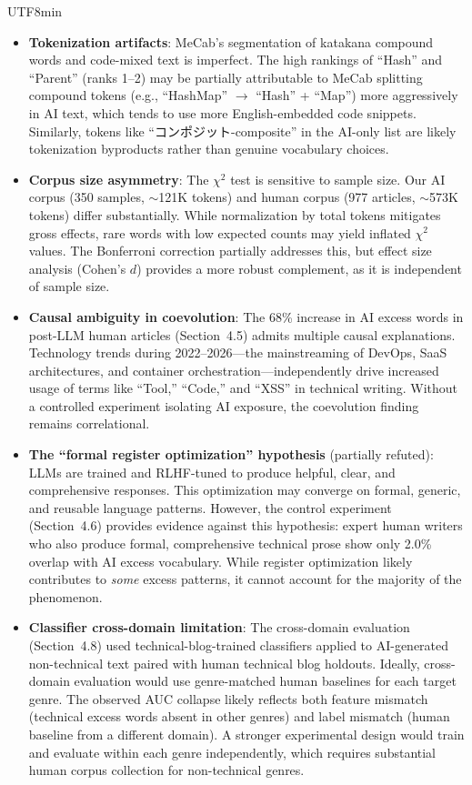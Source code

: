 \documentclass[11pt,a4paper]{article}
\begin{document}
\begin{CJK}{UTF8}{min}
\begin{itemize}
    \item \textbf{Tokenization artifacts}: MeCab's segmentation of katakana compound words and code-mixed text is imperfect. The high rankings of ``Hash'' and ``Parent'' (ranks 1--2) may be partially attributable to MeCab splitting compound tokens (e.g., ``HashMap'' $\to$ ``Hash'' + ``Map'') more aggressively in AI text, which tends to use more English-embedded code snippets. Similarly, tokens like ``コンポジット-composite'' in the AI-only list are likely tokenization byproducts rather than genuine vocabulary choices.

    \item \textbf{Corpus size asymmetry}: The $\chi^2$ test is sensitive to sample size. Our AI corpus (350 samples, $\sim$121K tokens) and human corpus (977 articles, $\sim$573K tokens) differ substantially. While normalization by total tokens mitigates gross effects, rare words with low expected counts may yield inflated $\chi^2$ values. The Bonferroni correction partially addresses this, but effect size analysis (Cohen's $d$) provides a more robust complement, as it is independent of sample size.

    \item \textbf{Causal ambiguity in coevolution}: The 68\% increase in AI excess words in post-LLM human articles (Section~4.5) admits multiple causal explanations. Technology trends during 2022--2026---the mainstreaming of DevOps, SaaS architectures, and container orchestration---independently drive increased usage of terms like ``Tool,'' ``Code,'' and ``XSS'' in technical writing. Without a controlled experiment isolating AI exposure, the coevolution finding remains correlational.

    \item \textbf{The ``formal register optimization'' hypothesis} (partially refuted): LLMs are trained and RLHF-tuned to produce helpful, clear, and comprehensive responses. This optimization may converge on formal, generic, and reusable language patterns. However, the control experiment (Section~4.6) provides evidence against this hypothesis: expert human writers who also produce formal, comprehensive technical prose show only 2.0\% overlap with AI excess vocabulary. While register optimization likely contributes to \emph{some} excess patterns, it cannot account for the majority of the phenomenon.

    \item \textbf{Classifier cross-domain limitation}: The cross-domain evaluation (Section~4.8) used technical-blog-trained classifiers applied to AI-generated non-technical text paired with human technical blog holdouts. Ideally, cross-domain evaluation would use genre-matched human baselines for each target genre. The observed AUC collapse likely reflects both feature mismatch (technical excess words absent in other genres) and label mismatch (human baseline from a different domain). A stronger experimental design would train and evaluate within each genre independently, which requires substantial human corpus collection for non-technical genres.


\end{itemize}
\end{CJK}
\end{document}
